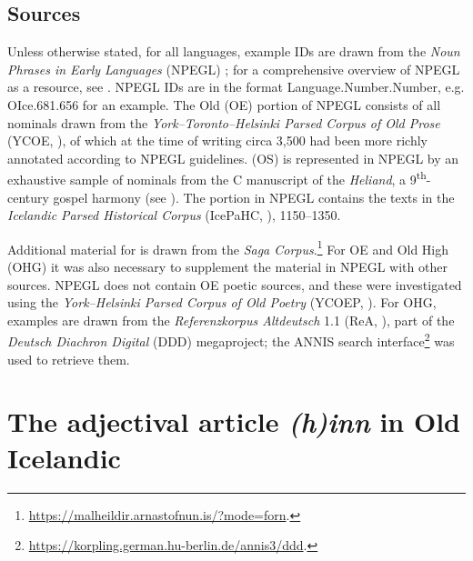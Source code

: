 \documentclass[output=paper,colorlinks,citecolor=brown]{langscibook}
\begin{document}
\subsection{Sources}\label{sec:9:sources}

\begin{sloppypar}
Unless otherwise stated, for all languages, example IDs are drawn from the \textit{Noun Phrases in Early  Languages} (NPEGL) ; for a comprehensive overview of NPEGL as a  resource, see . NPEGL IDs are in the format Language.Number.Number, e.g. OIce.681.656 for an  example. The Old  (OE) portion of NPEGL consists of all nominals drawn from the \textit{York--Toronto--Helsinki Parsed Corpus of Old  Prose} (YCOE, \cite{YCOE}), of which at the time of writing circa 3,500 had been more richly annotated according to NPEGL guidelines.  (OS) is represented in NPEGL by an exhaustive sample of nominals from the C manuscript of the \emph{Heliand}, a 9\textsuperscript{th}-century gospel harmony (see \citealp{Walkden16}). The  portion in NPEGL contains the texts in the \textit{Icelandic Parsed Historical Corpus} (IcePaHC, \cite{IcePaHC}), 1150--1350. 
\end{sloppypar}


Additional material for  is drawn from  the \textit{Saga Corpus}.\footnote{\url{https://malheildir.arnastofnun.is/?mode=forn}. }  
For OE and Old High  (OHG) it was also necessary to supplement the material in NPEGL with other sources. NPEGL does not contain OE poetic sources, and these were investigated using the \textit{York--Helsinki Parsed Corpus of Old  Poetry} (YCOEP, \citealt{YCOEP}). For OHG, examples are drawn from the \textit{Referenzkorpus Altdeutsch} 1.1 (ReA, \cite{RefKorpAltD}), part of the \emph{Deutsch Diachron Digital} (DDD) megaproject; the ANNIS search interface\footnote{\url{https://korpling.german.hu-berlin.de/annis3/ddd}.} was used to retrieve them.




\section{The adjectival article \textit{(h)inn} in Old Icelandic}
\label{sec:9:adjArtON}
\end{document}
